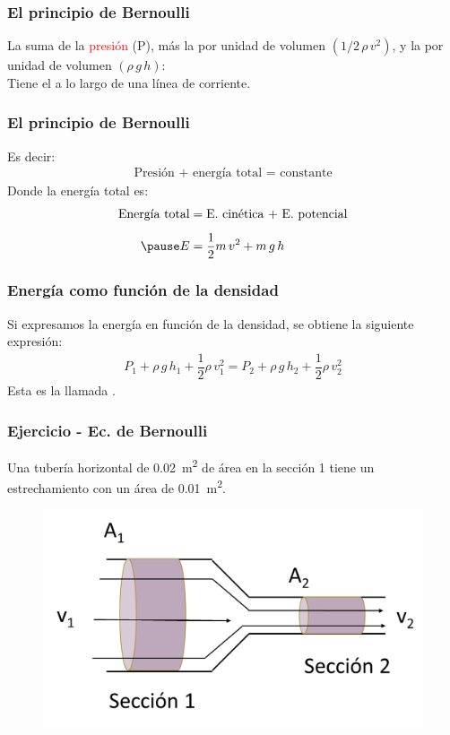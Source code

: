 \documentclass[14pt]{beamer}
\begin{document}
\begin{frame}
\frametitle{El principio de Bernoulli}
La suma de la \textcolor{red}{presión} (P), más la  por unidad de volumen $(1/2 \, \rho \, v^{2})$, y la  por unidad de volumen $(\rho \, g \, h)$:
\\
\bigskip
\pause
Tiene el  a lo largo de una línea de corriente.
\end{frame}
\begin{frame}
\frametitle{El principio de Bernoulli}
Es decir:
\pause
\begin{align*}
\text{Presión + energía total = constante} 
\end{align*}
\pause
Donde la energía total es:
\pause
\begin{eqnarray*}
\begin{aligned}
\text{Energía total} &= \text{E. cinética + E. potencial} \\[0.5em] \pause
E &= \dfrac{1}{2} m \, v^{2} + m \, g \, h
\end{aligned}
\end{eqnarray*}
\end{frame}
\begin{frame}
\frametitle{Energía como función de la densidad}
Si expresamos la energía en función de la densidad, se obtiene la siguiente expresión:
\pause
\begin{align*}
P_{1} + \rho \, g \, h_{1} + \dfrac{1}{2} \rho \, v_{1}^{2} = P_{2} + \rho \, g \, h_{2} + \dfrac{1}{2} \rho \, v_{2}^{2}
\end{align*}
Esta es la llamada .
\end{frame}
\begin{frame}
\frametitle{Ejercicio - Ec. de Bernoulli}
Una tubería horizontal de \SI{0.02}{\square\meter} de área en la sección 1 tiene un estrechamiento con un área de \SI{0.01}{\square\meter}. 
\begin{figure}
    \centering
    \includegraphics[scale=0.8]{Imagenes/Ejercicio_Bernoulli_01.png}
\end{figure}
\end{frame}
\end{document}
